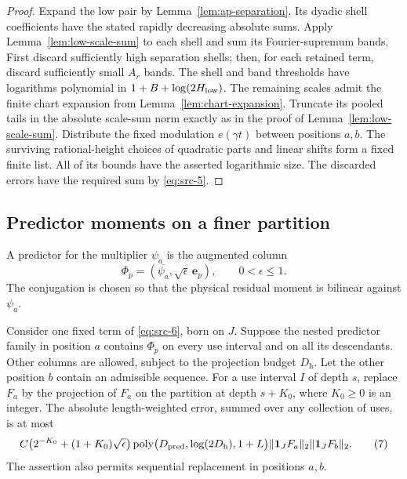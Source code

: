 \begin{proof}
Expand the low pair by Lemma~\ref{lem:ap-separation}.  Its dyadic shell
coefficients have the stated rapidly decreasing absolute sums.  Apply
Lemma~\ref{lem:low-scale-sum} to each shell and sum its Fourier-supremum
bands.  First discard sufficiently high separation shells; then, for
each retained term, discard sufficiently small $A_r$ bands.  The shell
and band thresholds have logarithms polynomial in
$1+B+\log(2H_{\rm low})$.  The remaining scales admit the finite
chart expansion from Lemma~\ref{lem:chart-expansion}.  Truncate its
pooled tails in the absolute scale-sum norm exactly as in the proof of
Lemma~\ref{lem:low-scale-sum}.  Distribute the fixed modulation
$e(\gamma t)$ between positions $a,b$.  The surviving rational-height
choices of quadratic parts and linear shifts form a fixed finite list.
All of its bounds have the asserted logarithmic size.  The discarded
errors have the required sum by \eqref{eq:src-5}.
\end{proof}

\subsection{Predictor moments on a finer partition}

A predictor for the multiplier $\psi_a$ is the augmented column
\[
 \Phi_p=(\overline{\psi_a},\sqrt\epsilon\,\mathbf e_p),
 \qquad 0<\epsilon\le1.
\]
The conjugation is chosen so that the physical residual moment is
bilinear against $\psi_a$.

\begin{lemma}
\label{lem:predictor-replacement}
Consider one fixed term of \eqref{eq:src-6}, born on $J$.  Suppose the
nested predictor family in position $a$ contains $\Phi_p$ on every
use interval and on all its descendants.  Other columns are allowed,
subject to the projection budget $D_{\mathrm h}$.  Let the other
position $b$ contain an admissible sequence.  For a use interval $I$
of depth $s$, replace $F_a$ by the projection of $F_a$ on the partition
at depth $s+K_0$, where $K_0\ge0$ is an integer.  The absolute
length-weighted error, summed over any collection of uses, is at most
\begin{equation*}
 C\bigl(2^{-K_0}+(1+K_0)\sqrt\epsilon\bigr)
 \operatorname{poly}\bigl(D_{\rm pred},\log(2D_{\mathrm h}),1+L\bigr)
 \|\mathbf 1_JF_a\|_2\|\mathbf 1_JF_b\|_2.
\tag{7}\label{eq:src-7}
\end{equation*}
The assertion also permits sequential replacement in positions $a,b$.
\end{lemma}

